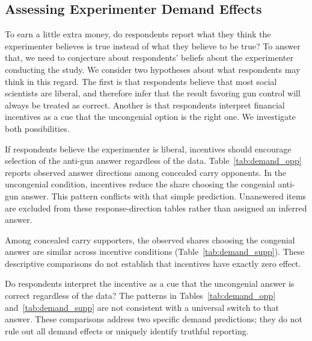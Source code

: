 \bigskip
\begingroup\footnotesize\singlespacing

\endgroup
\normalsize
\doublespacing

\begingroup\footnotesize\singlespacing

\endgroup
\normalsize
\doublespacing


\clearpage
\subsection{Assessing Experimenter Demand Effects}
\label{sec:demand}

To earn a little extra money, do respondents report what they think the experimenter believes is true instead of what they believe to be true? To answer that, we need to conjecture about respondents' beliefs about the experimenter conducting the study. We consider two hypotheses about what respondents may think in this regard. The first is that respondents believe that most social scientists are liberal, and therefore infer that the result favoring gun control will always be treated as correct. Another is that respondents interpret financial incentives as a cue that the uncongenial option is the right one. We investigate both possibilities.

If respondents believe the experimenter is liberal, incentives should encourage selection of the anti-gun answer regardless of the data. Table~\ref{tab:demand_opp} reports observed answer directions among concealed carry opponents. In the uncongenial condition, incentives reduce the share choosing the congenial anti-gun answer. This pattern conflicts with that simple prediction. Unanswered items are excluded from these response-direction tables rather than assigned an inferred answer.

Among concealed carry supporters, the observed shares choosing the congenial answer are similar across incentive conditions (Table~\ref{tab:demand_supp}). These descriptive comparisons do not establish that incentives have exactly zero effect.

\singlespacing
\begingroup\footnotesize\singlespacing

\endgroup
\doublespacing

\singlespacing
\begingroup\footnotesize\singlespacing

\endgroup
\doublespacing

Do respondents interpret the incentive as a cue that the uncongenial answer is correct regardless of the data? The patterns in Tables~\ref{tab:demand_opp} and~\ref{tab:demand_supp} are not consistent with a universal switch to that answer. These comparisons address two specific demand predictions; they do not rule out all demand effects or uniquely identify truthful reporting.

